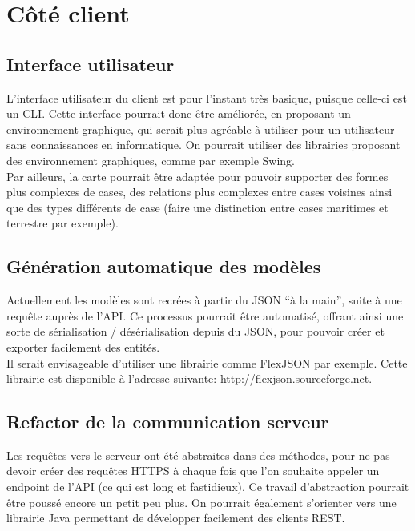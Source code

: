 
\section{Côté client}

	 \subsection{Interface utilisateur} %
	 \label{sub:interface_utilisateur}
	 	L'interface utilisateur du client est pour l'instant très basique, puisque celle-ci est un CLI. Cette interface pourrait donc être améliorée, en proposant un environnement graphique, qui serait plus agréable à utiliser pour un utilisateur sans connaissances en informatique. On pourrait utiliser des librairies proposant des environnement graphiques, comme par exemple Swing.\\

	 	Par ailleurs, la carte pourrait être adaptée pour pouvoir supporter des formes plus complexes de cases, des relations plus complexes entre cases voisines ainsi que des types différents de case (faire une distinction entre cases maritimes et terrestre par exemple).

	 \subsection{Génération automatique des modèles} %
	 \label{sub:g_n_ration_automatique_des_mod_les}
	 	Actuellement les modèles sont recrées à partir du JSON \enquote{à la main}, suite à une requête auprès de l'API. Ce processus pourrait être automatisé, offrant ainsi une sorte de sérialisation / désérialisation depuis du JSON, pour pouvoir créer et exporter facilement des entités.\\

	 	Il serait envisageable d'utiliser une librairie comme FlexJSON par exemple. Cette librairie est disponible à l'adresse suivante: \url{http://flexjson.sourceforge.net}.


	 \subsection{Refactor de la communication serveur} %
	 \label{sub:refactor_de_la_communication_serveur}
	 	Les requêtes vers le serveur ont été abstraites dans des méthodes, pour ne pas devoir créer des requêtes HTTPS à chaque fois que l'on souhaite appeler un endpoint de l'API (ce qui est long et fastidieux). Ce travail d'abstraction pourrait être poussé encore un petit peu plus. On pourrait également s'orienter vers une librairie Java permettant de développer facilement des clients REST.

